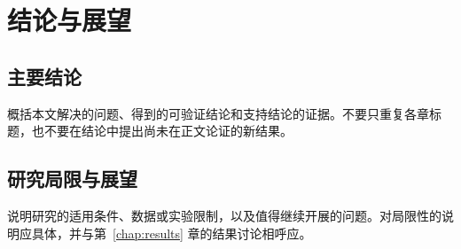 \chapter{结论与展望}
\label{chap:conclusion}

\section{主要结论}

概括本文解决的问题、得到的可验证结论和支持结论的证据。不要只重复各章标题，也不要在结论中提出尚未在正文论证的新结果。

\section{研究局限与展望}

说明研究的适用条件、数据或实验限制，以及值得继续开展的问题。对局限性的说明应具体，并与第~\ref{chap:results} 章的结果讨论相呼应。
